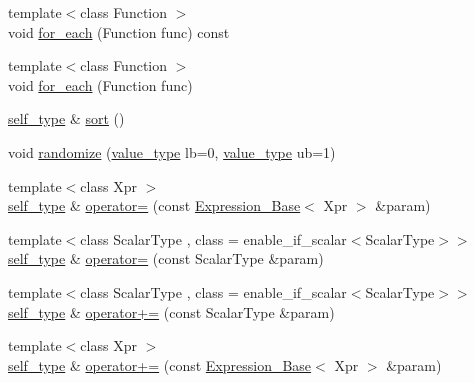 \begin{DoxyCompactItemize}
\item 
{\footnotesize template$<$class Function $>$ }\\void \hyperlink{classbc_1_1tensors_1_1Tensor__Base_a9fe034c382e885af2cfe5d79fd71015c}{for\+\_\+each} (Function func) const
\item 
{\footnotesize template$<$class Function $>$ }\\void \hyperlink{classbc_1_1tensors_1_1Tensor__Base_ae8e32bf8cf8d0c6da6310d4084d0e856}{for\+\_\+each} (Function func)
\item 
\hyperlink{classbc_1_1tensors_1_1Expression__Base}{self\+\_\+type} \& \hyperlink{classbc_1_1tensors_1_1Tensor__Base_a49aec3b38b0206c5a738ffbfd1fd1777}{sort} ()
\item 
void \hyperlink{classbc_1_1tensors_1_1Tensor__Base_ae49f60c020a5180113d54a379a886eb4}{randomize} (\hyperlink{classbc_1_1tensors_1_1Expression__Base_acda5b4e228c9b3cb9174258d5caf860a}{value\+\_\+type} lb=0, \hyperlink{classbc_1_1tensors_1_1Expression__Base_acda5b4e228c9b3cb9174258d5caf860a}{value\+\_\+type} ub=1)
\item 
{\footnotesize template$<$class Xpr $>$ }\\\hyperlink{classbc_1_1tensors_1_1Expression__Base}{self\+\_\+type} \& \hyperlink{classbc_1_1tensors_1_1Tensor__Base_abfe07c092882deebf54de9d4d1f0e570}{operator=} (const \hyperlink{classbc_1_1tensors_1_1Expression__Base}{Expression\+\_\+\+Base}$<$ Xpr $>$ \&param)
\item 
{\footnotesize template$<$class Scalar\+Type , class  = enable\+\_\+if\+\_\+scalar$<$\+Scalar\+Type$>$$>$ }\\\hyperlink{classbc_1_1tensors_1_1Expression__Base}{self\+\_\+type} \& \hyperlink{classbc_1_1tensors_1_1Tensor__Base_a137e4c4646c288a963246df0e99f1c68}{operator=} (const Scalar\+Type \&param)
\item 
{\footnotesize template$<$class Scalar\+Type , class  = enable\+\_\+if\+\_\+scalar$<$\+Scalar\+Type$>$$>$ }\\\hyperlink{classbc_1_1tensors_1_1Expression__Base}{self\+\_\+type} \& \hyperlink{classbc_1_1tensors_1_1Tensor__Base_abe1b66e48596f43dfc7f474ce432efa3}{operator+=} (const Scalar\+Type \&param)
\item 
{\footnotesize template$<$class Xpr $>$ }\\\hyperlink{classbc_1_1tensors_1_1Expression__Base}{self\+\_\+type} \& \hyperlink{classbc_1_1tensors_1_1Tensor__Base_a450511fb41ea6cd0e4462a0c5b76483f}{operator+=} (const \hyperlink{classbc_1_1tensors_1_1Expression__Base}{Expression\+\_\+\+Base}$<$ Xpr $>$ \&param)

\end{DoxyCompactItemize}
